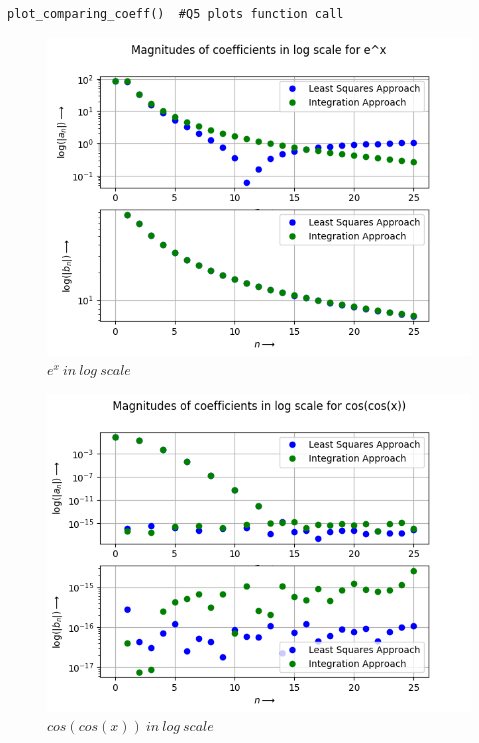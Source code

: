 \documentclass[11pt, a4paper]{article}
\begin{document}
\begin{lstlisting}
plot_comparing_coeff()  #Q5 plots function call
\end{lstlisting}
\begin{figure}[!tbh]
    \centering
    \includegraphics[scale = 0.7]{Q5-1.png}
    \caption{$e^x\ in\ log\ scale$}
    \label{fig:Figure 7}
\end{figure}
\begin{figure}
    \centering
    \includegraphics[scale = 0.7]{Q5-2.png}
    \caption{$cos(cos(x))\ in\ log\ scale$}
    \label{fig:Figure 8}
\end{figure}
\end{document}
